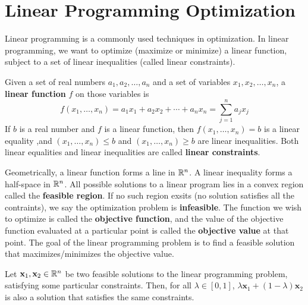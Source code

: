 \section{Linear Programming Optimization}

Linear programming is a commonly used techniques in optimization. In linear programming, we want to optimize (maximize or minimize) a linear function, subject to a set of linear inequalities (called linear constraints). 

\begin{definition}    
    Given a set of real numbers $a_1,a_2,\ldots,a_n$ and a set of variables $x_1,x_2,\ldots,x_n$, a \textbf{linear function} $f$ on those variables is
    $$
    f(x_1,\ldots,x_n) = a_1x_1 + a_2x_2 + \cdots + a_nx_n = \sum_{j=1}^n a_jx_j
    $$
    If $b$ is a real number and $f$ is a linear function, then $f(x_1,\ldots,x_n) = b$ is a linear equality ,and $(x_1,\ldots,x_n) \leq b$ and $(x_1,\ldots,x_n) \geq b$ are linear inequalities. Both linear equalities and linear inequalities are called \textbf{linear constraints}.
\end{definition}

Geometrically, a linear function forms a line in $\mathbb{R}^n$. A linear inequality forms a half-space in $\mathbb{R}^n$. All possible solutions to a linear program lies in a convex region called the \textbf{feasible region}. If no such region exsits (no solution satisfies all the contraints), we say the optimization problem is \textbf{infeasible}. The function we wish to optimize is called the \textbf{objective function}, and the value of the objective function evaluated at a particular point is called the \textbf{objective value} at that point. The goal of the linear programming problem is to find a feasible solution that maximizes/minimizes the objective value.

\begin{theorem}
    Let $\mathbf{x}_1,\mathbf{x}_2 \in \mathbb{R}^n$ be two feasible solutions to the linear programming problem, satisfying some particular constraints. Then, for all $\lambda \in [0,1]$, $\lambda\mathbf{x}_1 + (1-\lambda)\mathbf{x}_2$ is also a solution that satisfies the same constraints.
\end{theorem}

